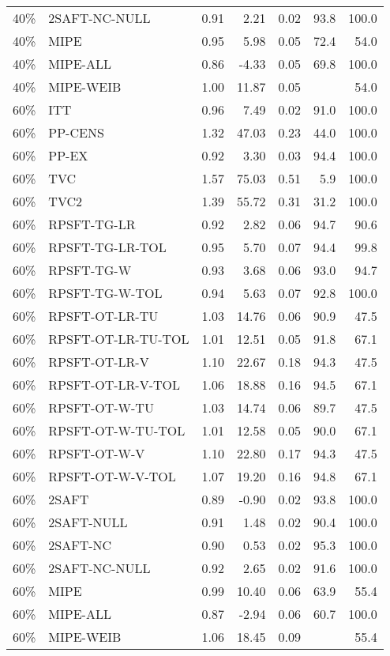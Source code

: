 \begin{table}[ht]
{\begin{tabular}{llrrrrr}
  40\% & 2SAFT-NC-NULL & 0.91 & 2.21 & 0.02 & 93.8 & 100.0 \\ 
  40\% & MIPE & 0.95 & 5.98 & 0.05 & 72.4 & 54.0 \\ 
  40\% & MIPE-ALL & 0.86 & -4.33 & 0.05 & 69.8 & 100.0 \\ 
  40\% & MIPE-WEIB & 1.00 & 11.87 & 0.05 &  & 54.0 \\ 
   \hline
60\% & ITT & 0.96 & 7.49 & 0.02 & 91.0 & 100.0 \\ 
  60\% & PP-CENS & 1.32 & 47.03 & 0.23 & 44.0 & 100.0 \\ 
  60\% & PP-EX & 0.92 & 3.30 & 0.03 & 94.4 & 100.0 \\ 
  60\% & TVC & 1.57 & 75.03 & 0.51 & 5.9 & 100.0 \\ 
  60\% & TVC2 & 1.39 & 55.72 & 0.31 & 31.2 & 100.0 \\ 
   \hline
60\% & RPSFT-TG-LR & 0.92 & 2.82 & 0.06 & 94.7 & 90.6 \\ 
  60\% & RPSFT-TG-LR-TOL & 0.95 & 5.70 & 0.07 & 94.4 & 99.8 \\ 
  60\% & RPSFT-TG-W & 0.93 & 3.68 & 0.06 & 93.0 & 94.7 \\ 
  60\% & RPSFT-TG-W-TOL & 0.94 & 5.63 & 0.07 & 92.8 & 100.0 \\ 
  60\% & RPSFT-OT-LR-TU & 1.03 & 14.76 & 0.06 & 90.9 & 47.5 \\ 
  60\% & RPSFT-OT-LR-TU-TOL & 1.01 & 12.51 & 0.05 & 91.8 & 67.1 \\ 
  60\% & RPSFT-OT-LR-V & 1.10 & 22.67 & 0.18 & 94.3 & 47.5 \\ 
  60\% & RPSFT-OT-LR-V-TOL & 1.06 & 18.88 & 0.16 & 94.5 & 67.1 \\ 
   \hline
60\% & RPSFT-OT-W-TU & 1.03 & 14.74 & 0.06 & 89.7 & 47.5 \\ 
  60\% & RPSFT-OT-W-TU-TOL & 1.01 & 12.58 & 0.05 & 90.0 & 67.1 \\ 
  60\% & RPSFT-OT-W-V & 1.10 & 22.80 & 0.17 & 94.3 & 47.5 \\ 
  60\% & RPSFT-OT-W-V-TOL & 1.07 & 19.20 & 0.16 & 94.8 & 67.1 \\ 
   \hline
60\% & 2SAFT & 0.89 & -0.90 & 0.02 & 93.8 & 100.0 \\ 
  60\% & 2SAFT-NULL & 0.91 & 1.48 & 0.02 & 90.4 & 100.0 \\ 
  60\% & 2SAFT-NC & 0.90 & 0.53 & 0.02 & 95.3 & 100.0 \\ 
  60\% & 2SAFT-NC-NULL & 0.92 & 2.65 & 0.02 & 91.6 & 100.0 \\ 
  60\% & MIPE & 0.99 & 10.40 & 0.06 & 63.9 & 55.4 \\ 
  60\% & MIPE-ALL & 0.87 & -2.94 & 0.06 & 60.7 & 100.0 \\ 
  60\% & MIPE-WEIB & 1.06 & 18.45 & 0.09 &  & 55.4 \\ 
   \hline
\end{tabular}
}
\end{table}
